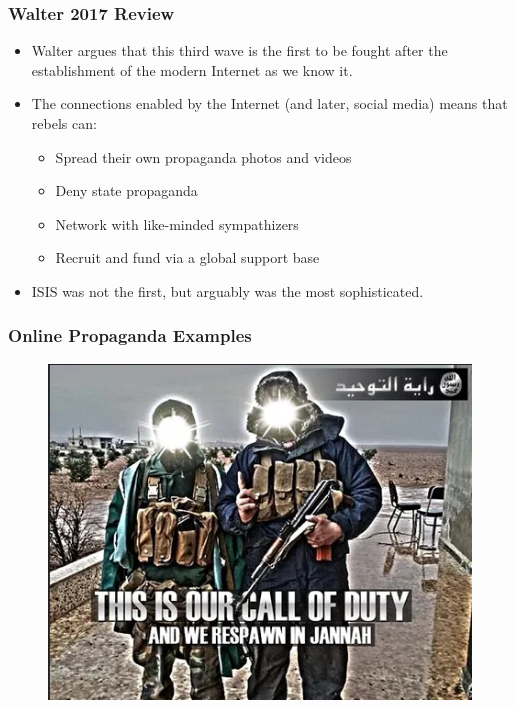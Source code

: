 \documentclass[handout]{beamer}
\begin{document}
\begin{frame} 
	\frametitle{\LARGE{Walter 2017 Review}}
	\begin{itemize}
		\item Walter argues that this third wave is the first to be fought after the establishment of the modern Internet as we know it. \pause
		\item The connections enabled by the Internet (and later, social media) means that rebels can: \pause
		\begin{itemize}
			\item Spread their own propaganda photos and videos
			\item Deny state propaganda
			\item Network with like-minded sympathizers
			\item Recruit and fund via a global support base \pause
		\end{itemize}
	\item ISIS was not the first, but arguably was the most sophisticated.
	\end{itemize}
\end{frame}

\begin{frame} 
	\frametitle{\LARGE{Online Propaganda Examples}}
	\begin{figure}[ht!]
		\centering
		\includegraphics[width=\textwidth,height=0.9\textheight,keepaspectratio]{ISISprop1.png}
	\end{figure}
\end{frame}
\end{document}
